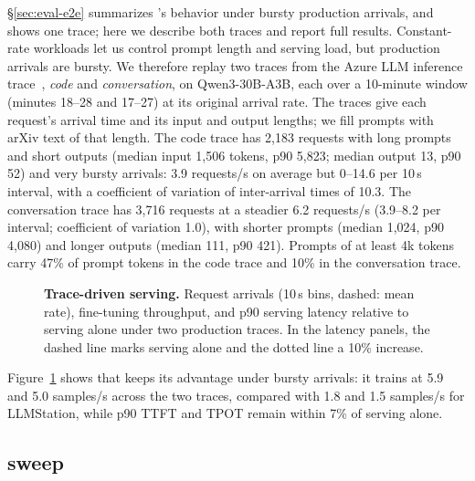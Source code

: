 \S\ref{sec:eval-e2e} summarizes \sys{}'s behavior under bursty production
arrivals, and  shows one trace; here we describe
both traces and report full results. Constant-rate workloads let us
control prompt length and serving load, but production arrivals are
bursty. We therefore replay two traces from
the Azure LLM inference trace~\cite{splitwise}, \emph{code} and
\emph{conversation}, on Qwen3-30B-A3B, each over a 10-minute window
(minutes 18--28 and 17--27) at its original arrival rate. The traces
give each request's arrival time and its input and output lengths; we
fill prompts with arXiv text of that length. The code trace has 2,183
requests with long prompts and short outputs (median input 1,506 tokens,
p90 5,823; median output 13, p90 52) and very bursty arrivals: 3.9
requests/s on average but 0--14.6 per 10\,s interval, with a
coefficient of variation of inter-arrival times of 10.3. The
conversation trace has 3,716 requests at a steadier 6.2 requests/s
(3.9--8.2 per interval; coefficient of variation 1.0), with shorter
prompts (median 1,024, p90 4,080) and longer outputs (median 111, p90
421). Prompts of at least 4k tokens carry 47\% of prompt tokens in the
code trace and 10\% in the conversation trace.

\begin{figure}[t]
  \centering
  \caption{\textbf{Trace-driven serving.}
    Request arrivals (10\,s bins, dashed: mean rate), fine-tuning
    throughput, and p90 serving latency relative to serving alone under
    two production traces. In the latency panels, the dashed line marks
    serving alone and the dotted line a 10\% increase. }
  \label{fig:eval-traces}
\end{figure}

Figure~\ref{fig:eval-traces} shows that \sys{} keeps its advantage
under bursty arrivals: it trains at 5.9 and 5.0 samples/s across the two
traces, compared with 1.8 and 1.5 samples/s for LLMStation, while p90
\ac{TTFT} and \ac{TPOT} remain within 7\% of serving alone.

\subsection{\Uncoord sweep}
\label{sec:appx-naive}


